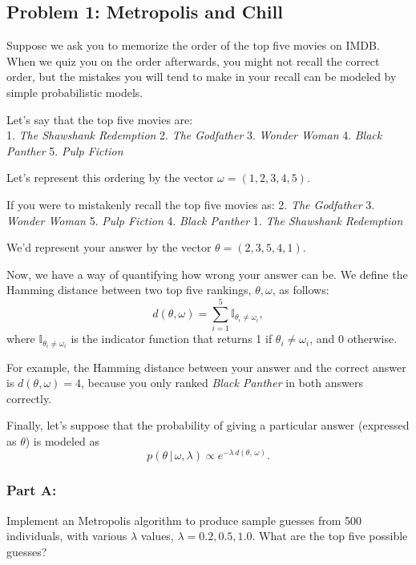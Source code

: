 \documentclass[11pt]{article}
\begin{document}
    \subsection{Problem 1: Metropolis and
Chill}\label{problem-1-metropolis-and-chill}

Suppose we ask you to memorize the order of the top five movies on IMDB.
When we quiz you on the order afterwards, you might not recall the
correct order, but the mistakes you will tend to make in your recall can
be modeled by simple probabilistic models.

Let's say that the top five movies are:\\
1. \emph{The Shawshank Redemption} 2. \emph{The Godfather} 3.
\emph{Wonder Woman} 4. \emph{Black Panther} 5. \emph{Pulp Fiction}

Let's represent this ordering by the vector \(\omega = (1,2,3,4,5)\).

If you were to mistakenly recall the top five movies as: 2. \emph{The
Godfather} 3. \emph{Wonder Woman} 5. \emph{Pulp Fiction} 4. \emph{Black
Panther} 1. \emph{The Shawshank Redemption}

We'd represent your answer by the vector \(\theta = (2,3,5,4,1)\).

Now, we have a way of quantifying how wrong your answer can be. We
define the Hamming distance between two top five rankings,
\(\theta, \omega\), as follows:
\[d(\theta, \omega) = \sum_{i=1}^5 \mathbb{I}_{\theta_i\neq \omega_i},\]
where \(\mathbb{I}_{\theta_i\neq \omega_i}\) is the indicator function
that returns 1 if \(\theta_i\neq \omega_i\), and 0 otherwise.

For example, the Hamming distance between your answer and the correct
answer is \(d(\theta, \omega)=4\), because you only ranked \emph{Black
Panther} in both answers correctly.

Finally, let's suppose that the probability of giving a particular
answer (expressed as \(\theta\)) is modeled as
\[ p(\theta \,|\, \omega, \lambda) \propto  e^{-\lambda\, d(\theta,\, \omega)}.\]

\subsubsection{Part A:}\label{part-a}

Implement an Metropolis algorithm to produce sample guesses from 500
individuals, with various \(\lambda\) values, \(\lambda=0.2, 0.5, 1.0\).
What are the top five possible guesses?
\end{document}
